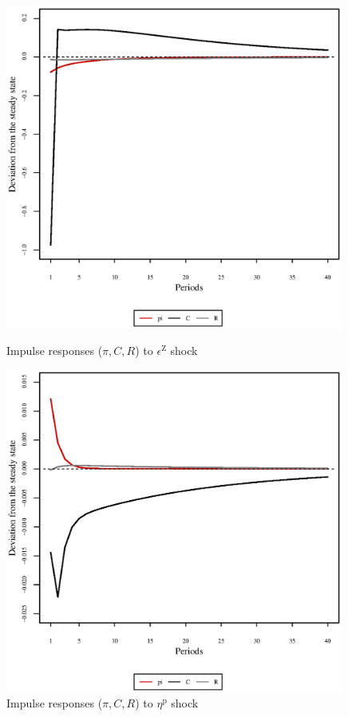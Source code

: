 \begin{figure}[h]
\begin{minipage}{0.5\textwidth}
\vspace*{-3em}
\centering
\includegraphics[width=0.99\textwidth, scale=0.55]{plots/plot_136.eps}
\caption{Impulse responses ($\pi, C, R$) to $\epsilon^{\mathrm{Z}}$ shock}
\end{minipage}
\begin{minipage}{0.5\textwidth}
\vspace*{-3em}
\centering
\includegraphics[width=0.99\textwidth, scale=0.55]{plots/plot_137.eps}
\caption{Impulse responses ($\pi, C, R$) to $\eta^{\mathrm{p}}$ shock}
\end{minipage}
\end{figure}

